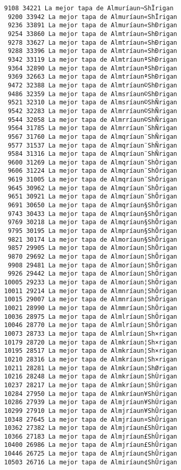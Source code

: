 \documentclass[11pt]{article}
\begin{document}
\begin{Verbatim}[commandchars=\\\{\}]
 9108 34221 La mejor tapa de Almuríaun¬ShÏrigan
 9200 33942 La mejor tapa de Almuríaun«ShÏrigan
 9236 33891 La mejor tapa de Almuríaun«ShÐrigan
 9254 33860 La mejor tapa de Almtríaun«ShÐrigan
 9278 33627 La mejor tapa de Almtríaun«ShÐrigan
 9288 33396 La mejor tapa de Almtríaun«ShÐrigan
 9342 33119 La mejor tapa de AlmtríaunªShÐrigan
 9364 32890 La mejor tapa de AlmtríaunªShÐrigan
 9369 32663 La mejor tapa de AlmtríaunªShÐrigan
 9472 32388 La mejor tapa de Almtríaun©ShÐrigan
 9486 32359 La mejor tapa de Almsríaun©ShÐrigan
 9521 32310 La mejor tapa de Almsríaun©ShÑrigan
 9542 32283 La mejor tapa de Almrríaun©ShÑrigan
 9544 32058 La mejor tapa de Almrríaun©ShÑrigan
 9564 31785 La mejor tapa de Almrríaun¨ShÑrigan
 9567 31760 La mejor tapa de Almqríaun¨ShÑrigan
 9577 31537 La mejor tapa de Almqríaun¨ShÑrigan
 9584 31316 La mejor tapa de Almqríaun¨ShÑrigan
 9600 31269 La mejor tapa de Almqríaun¨ShÒrigan
 9606 31224 La mejor tapa de Almqríaun¨ShÓrigan
 9619 31005 La mejor tapa de Almqríaun¨ShÓrigan
 9645 30962 La mejor tapa de Almqríaun¨ShÔrigan
 9651 30921 La mejor tapa de Almqríaun¨ShÕrigan
 9691 30650 La mejor tapa de Almqríaun§ShÕrigan
 9743 30433 La mejor tapa de Almqríaun§ShÕrigan
 9769 30218 La mejor tapa de Almqríaun§ShÕrigan
 9795 30195 La mejor tapa de Almpríaun§ShÕrigan
 9821 30174 La mejor tapa de Almoríaun§ShÕrigan
 9857 29905 La mejor tapa de Almoríaun¦ShÕrigan
 9870 29692 La mejor tapa de Almoríaun¦ShÕrigan
 9908 29481 La mejor tapa de Almoríaun¦ShÕrigan
 9926 29442 La mejor tapa de Almoríaun¦ShÖrigan
10005 29233 La mejor tapa de Almoríaun¦ShÖrigan
10011 29214 La mejor tapa de Almnríaun¦ShÖrigan
10015 29007 La mejor tapa de Almnríaun¦ShÖrigan
10021 28990 La mejor tapa de Almmríaun¦ShÖrigan
10036 28975 La mejor tapa de Almlríaun¦ShÖrigan
10046 28770 La mejor tapa de Almlríaun¦ShÖrigan
10073 28733 La mejor tapa de Almlríaun¦Sh×rigan
10179 28720 La mejor tapa de Almkríaun¦Sh×rigan
10195 28517 La mejor tapa de Almkríaun¦Sh×rigan
10210 28316 La mejor tapa de Almkríaun¦Sh×rigan
10211 28281 La mejor tapa de Almkríaun¦ShØrigan
10216 28248 La mejor tapa de Almkríaun¦ShÙrigan
10237 28217 La mejor tapa de Almkríaun¦ShÚrigan
10284 27950 La mejor tapa de Almkríaun¥ShÚrigan
10286 27939 La mejor tapa de Almjríaun¥ShÚrigan
10299 27910 La mejor tapa de Almjríaun¥ShÛrigan
10348 27645 La mejor tapa de Almjríaun¤ShÛrigan
10362 27382 La mejor tapa de Almjríaun£ShÛrigan
10366 27183 La mejor tapa de Almjríaun£ShÛrigan
10400 26986 La mejor tapa de Almjríaun£ShÛrigan
10446 26725 La mejor tapa de Almjríaun¢ShÛrigan
10503 26716 La mejor tapa de Almiríaun¢ShÛrigan

\end{Verbatim}
\end{document}
